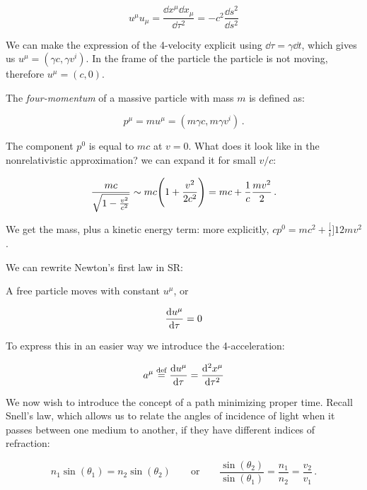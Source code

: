 \documentclass[main.tex]{subfiles}
\begin{document}
\begin{equation}
  u^{\mu} u_{\mu} = \frac{\dd{x^{\mu}} \dd{x_{\mu}}}{\dd{\tau^{2}}} = -c^2 \frac{\dd{s^{2}}}{\dd{s^2}}
\end{equation}


We can make the expression of the 4-velocity explicit using \(\dd{\tau} = \gamma \dd{t}\), which gives us \(u^{\mu} = (\gamma c, \gamma v^{i})\).
In the frame of the particle the particle is not moving, therefore \(u^{\mu} = (c, 0)\).   

The \emph{four-momentum} of a massive particle with mass \(m\) is defined as: 

\begin{equation}
  p^{\mu} = m u^{\mu} = (m \gamma c, m \gamma v^{i})\,.
\end{equation}

The component \(p^{0}\) is equal to \(mc\) at \(v=0\). What does it look like in the nonrelativistic approximation? we can expand it for small \(v/c\):

\begin{equation}
  \frac{mc}{\sqrt{1 - \frac{v^{2}}{c^{2}}}} \sim
  mc \qty(1 + \frac{v^{2}}{2 c^{2} } )
  = mc + \frac{1}{c} \frac{mv^{2}}{2}\,.
\end{equation}

We get the mass, plus a kinetic energy term: more explicitly, \(cp^0 = mc^{2} + \frac[i]{1}{2} m v^{2}\). 

We can rewrite Newton's first law in SR:

\begin{proposition}[Newton I]
A free particle moves with constant \(u^{\mu}\), or 

\begin{equation}
  \dv{u^{\mu}}{\tau} = 0 
\end{equation}
\end{proposition}

To express this in an easier way we introduce the 4-acceleration:

\begin{equation}
  a^{\mu} \stackrel{\text{def}}{=} \dv{u^{\mu}}{\tau} = \dv[2]{x^{\mu}}{\tau}
\end{equation}

We now wish to introduce the concept of a path minimizing proper time. 
Recall Snell's law, which allows us to relate the angles of incidence of light when it passes between one medium to another, if they have different indices of refraction:

\begin{equation}
  n_1 \sin(\theta_1 ) = n_2 \sin(\theta_2 )
  \qquad \text{or} \qquad
  \frac{\sin(\theta_{2})}{\sin(\theta_{1})} = \frac{n_1}{n_2 } = \frac{v_2}{v_1 }\,.
\end{equation}
\end{document}
